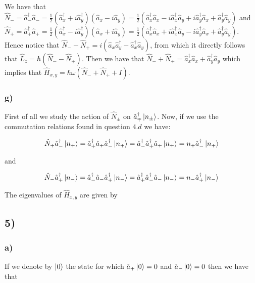 \documentclass[10pt,a4paper]{book}
\begin{document}
We have that $\hat{N}_-=\hat{a}_-^{\dagger}\hat{a}_-=\frac{1}{2}(\hat{a}_x^{\dagger}+i\hat{a}_y^{\dagger})(\hat{a}_x-i\hat{a}_y)=\frac{1}{2}(\hat{a}_x^{\dagger}\hat{a}_x-i\hat{a}_x^{\dagger}\hat{a}_y+i\hat{a}_y^{\dagger}\hat{a}_x+\hat{a}_y^{\dagger}\hat{a}_y)$ and
$\hat{N}_+=\hat{a}_+^{\dagger}\hat{a}_+=\frac{1}{2}(\hat{a}_x^{\dagger}-i\hat{a}_y^{\dagger})(\hat{a}_x+i\hat{a}_y)=\frac{1}{2}(\hat{a}_x^{\dagger}\hat{a}_x+i\hat{a}_x^{\dagger}\hat{a}_y-i\hat{a}_y^{\dagger}\hat{a}_x+\hat{a}_y^{\dagger}\hat{a}_y)$.
Hence notice that $\hat{N}_--\hat{N}_+=i(\hat{a}_x\hat{a}_y^{\dagger}-\hat{a}_x^{\dagger}\hat{a}_y)$, from which it directly follows that $\hat{L}_z=\hbar(\hat{N}_--\hat{N}_+)$. Then we have that $\hat{N}_-+\hat{N}_+=\hat{a}_x^{\dagger}\hat{a}_x+\hat{a}_y^{\dagger}\hat{a}_y$ which implies that $\hat{H}_{x,y}=\hbar\omega(\hat{N}_-+\hat{N}_++I)$.

\subsubsection*{g)}
First of all we study the action of $\hat{N}_{\pm}$ on $\hat{a}_{\mp}^{\dagger}\ket{n_{\pm}}$.  Now, if we use the commutation relations found in question $4.d$ we have:

$$\hat{N}_{+}\hat{a}_{-}^{\dagger}\ket{n_{+}}=\hat{a}_+^{\dagger}\hat{a}_+\hat{a}_-^{\dagger}\ket{n_+}=\hat{a}_-^{\dagger}\hat{a}_+^{\dagger}\hat{a}_+\ket{n_+}=n_+\hat{a}^{\dagger}_-\ket{n_+}$$

and 


$$\hat{N}_{-}\hat{a}_{+}^{\dagger}\ket{n_{-}}=\hat{a}_-^{\dagger}\hat{a}_-\hat{a}_+^{\dagger}\ket{n_-}=\hat{a}_+^{\dagger}\hat{a}_-^{\dagger}\hat{a}_-\ket{n_-}=n_-\hat{a}^{\dagger}_+\ket{n_-}$$






The eigenvalues of $\hat{H}_{x,y}$ are given by

\subsection*{5)}

\subsubsection*{a)}

If we denote by $\ket{0}$ the state for which $\hat{a}_+\ket{0}=0$ and $\hat{a}_-\ket{0}=0$ then we have that 
\end{document}
